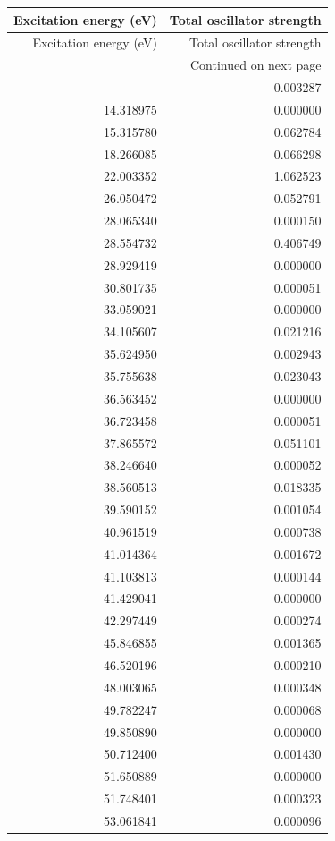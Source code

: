 \begin{longtable}{rr}
\toprule
Excitation energy (eV) & Total oscillator strength \\
\midrule
\endfirsthead
\toprule
Excitation energy (eV) & Total oscillator strength \\
\midrule
\endhead
\midrule
\multicolumn{2}{r}{Continued on next page} \\
\midrule
\endfoot
\bottomrule
\endlastfoot
11.639354 & 0.003287 \\
14.318975 & 0.000000 \\
15.315780 & 0.062784 \\
18.266085 & 0.066298 \\
22.003352 & 1.062523 \\
26.050472 & 0.052791 \\
28.065340 & 0.000150 \\
28.554732 & 0.406749 \\
28.929419 & 0.000000 \\
30.801735 & 0.000051 \\
33.059021 & 0.000000 \\
34.105607 & 0.021216 \\
35.624950 & 0.002943 \\
35.755638 & 0.023043 \\
36.563452 & 0.000000 \\
36.723458 & 0.000051 \\
37.865572 & 0.051101 \\
38.246640 & 0.000052 \\
38.560513 & 0.018335 \\
39.590152 & 0.001054 \\
40.961519 & 0.000738 \\
41.014364 & 0.001672 \\
41.103813 & 0.000144 \\
41.429041 & 0.000000 \\
42.297449 & 0.000274 \\
45.846855 & 0.001365 \\
46.520196 & 0.000210 \\
48.003065 & 0.000348 \\
49.782247 & 0.000068 \\
49.850890 & 0.000000 \\
50.712400 & 0.001430 \\
51.650889 & 0.000000 \\
51.748401 & 0.000323 \\
53.061841 & 0.000096 \\

\end{longtable}
